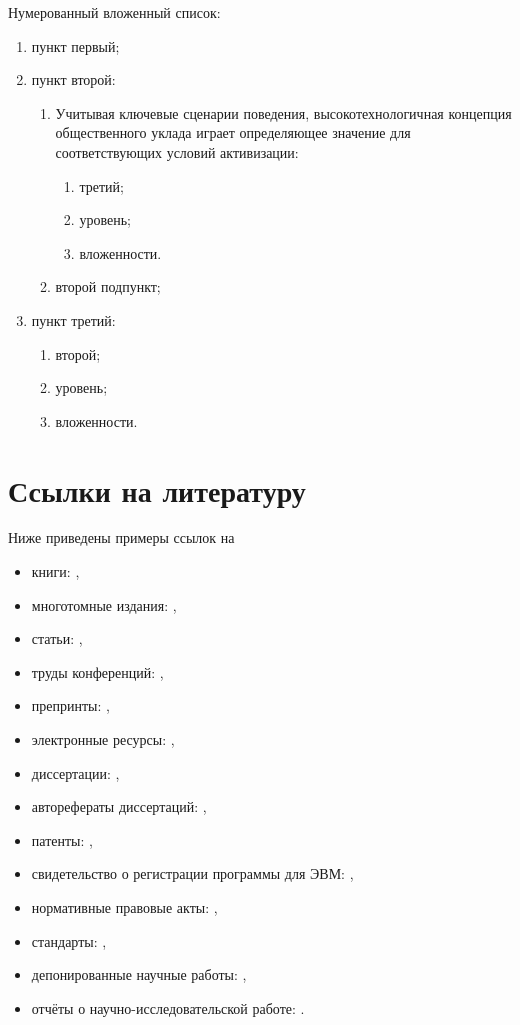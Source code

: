 \noindent Нумерованный вложенный список:
\begin{enumerate}
    \item пункт первый;
    \item пункт второй:
    \begin{enumerate}
            \item Учитывая ключевые сценарии поведения, 
            высокотехнологичная концепция общественного уклада играет 
            определяющее значение для соответствующих условий 
            активизации:
            \begin{enumerate}
                \item третий;
                \item уровень;
                \item вложенности.
            \end{enumerate}
            \item второй подпункт;
        \end{enumerate}
    \item пункт третий:
        \begin{enumerate}
            \item второй;
            \item уровень;
            \item вложенности.
        \end{enumerate}
\end{enumerate}


\section{Ссылки на литературу}\label{sec:ch1/sec3}

Ниже приведены примеры ссылок на 
\begin{itemize}
  \item книги: \cite{Sychev,Sokolov,Gaidaenko},
  \item многотомные издания: \cite{Lermontov,Russell},

  \item статьи: \cite{Berestova,Janiesch},
  \item труды конференций: \cite{Conference},
  \item препринты: \cite{arXiv,arXiv2},

  \item электронные ресурсы: \cite{Encyclopedia,Nasirova},
  \item диссертации: \cite{Lagkueva,Pokrovski,Belozerov},
  \item авторефераты диссертаций: \cite{Sirotko,Lukina},
  \item патенты: \cite{patent2,patent3,patbib1},
  \item свидетельство о регистрации программы для ЭВМ: \cite{progbib1},
  \item нормативные правовые акты: \cite{Constitution,FamilyCode},
  \item стандарты: \cite{Gost.7.0.53,standard3},
  \item депонированные научные работы: \cite{Razumovski},
  \item отчёты о научно-исследовательской работе: \cite{Methodology}.
\end{itemize}


